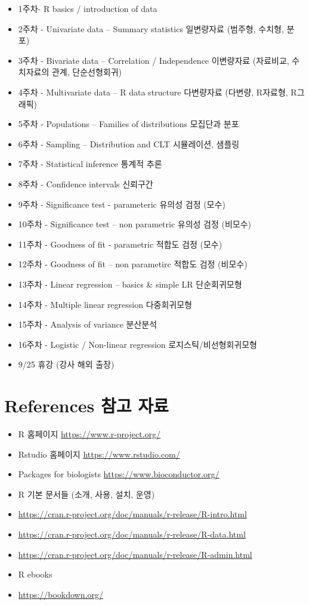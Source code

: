 \documentclass[]{book}
\providecommand{\tightlist}{%
  \setlength{\itemsep}{0pt}\setlength{\parskip}{0pt}}
\begin{document}
\begin{itemize}
\item
  1주차- R basics / introduction of data
\item
  2주차 - Univariate data -- Summary statistics 일변량자료 (범주형, 수치형, 분포)
\item
  3주차 - Bivariate data -- Correlation / Independence 이변량자료 (자료비교, 수치자료의 관계, 단순선형회귀)
\item
  4주차 - Multivariate data -- R data structure 다변량자료 (다변량, R자료형, R그래픽)
\item
  5주차 - Populations -- Families of distributions 모집단과 분포
\item
  6주차 - Sampling -- Distribution and CLT 시뮬레이션, 샘플링
\item
  7주차 - Statistical inference 통계적 추론
\item
  8주차 - Confidence intervals 신뢰구간
\item
  9주차 - Significance test - parameteric 유의성 검정 (모수)
\item
  10주차 - Significance test -- non parametric 유의성 검정 (비모수)
\item
  11주차 - Goodness of fit - parametric 적합도 검정 (모수)
\item
  12주차 - Goodness of fit -- non parametirc 적합도 검정 (비모수)
\item
  13주차 - Linear regression -- basics \& simple LR 단순회귀모형
\item
  14주차 - Multiple linear regression 다중회귀모형
\item
  15주차 - Analysis of variance 분산분석
\item
  16주차 - Logistic / Non-linear regression 로지스틱/비선형회귀모형
\item
  9/25 휴강 (강사 해외 출장)
\end{itemize}

\hypertarget{references---1}{%
\section{References 참고 자료}\label{references---1}}

\begin{itemize}
\tightlist
\item
  R 홈페이지 \url{https://www.r-project.org/}
\item
  Rstudio 홈페이지 \url{https://www.rstudio.com/}
\item
  Packages for biologists \url{https://www.bioconductor.org/}
\item
  R 기본 문서들 (소개, 사용, 설치, 운영)
\item
  \url{https://cran.r-project.org/doc/manuals/r-release/R-intro.html}
\item
  \url{https://cran.r-project.org/doc/manuals/r-release/R-data.html}
\item
  \url{https://cran.r-project.org/doc/manuals/r-release/R-admin.html}
\item
  R ebooks
\item
  \url{https://bookdown.org/}
\end{itemize}
\end{document}
